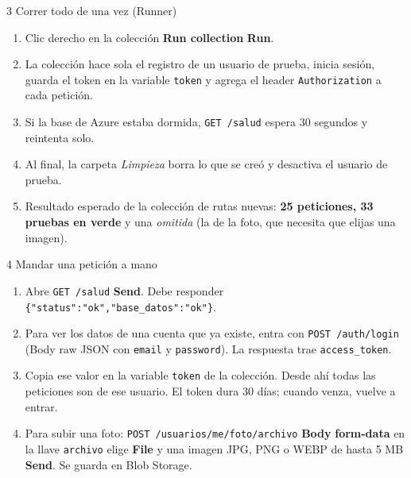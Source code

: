 \documentclass[11pt,a4paper]{article}
\newcommand{\menu}[1]{\textsf{\textbf{#1}}}
\begin{document}
\begin{paso}{3 \textperiodcentered{} Correr todo de una vez (Runner)}
\begin{enumerate}[leftmargin=*]
  \item Clic derecho en la colección \textrightarrow{} \menu{Run collection} \textrightarrow{} \menu{Run}.
  \item La colección hace sola el registro de un usuario de prueba, inicia sesión, guarda el token en la
        variable \texttt{token} y agrega el header \texttt{Authorization} a cada petición.
  \item Si la base de Azure estaba dormida, \texttt{GET /salud} espera 30 segundos y reintenta solo.
  \item Al final, la carpeta \emph{Limpieza} borra lo que se creó y desactiva el usuario de prueba.
  \item Resultado esperado de la colección de rutas nuevas: \textbf{25 peticiones, 33 pruebas en verde} y una
        \emph{omitida} (la de la foto, que necesita que elijas una imagen).
\end{enumerate}
\end{paso}

\begin{paso}{4 \textperiodcentered{} Mandar una petición a mano}
\begin{enumerate}[leftmargin=*]
  \item Abre \texttt{GET /salud} \textrightarrow{} \menu{Send}. Debe responder \texttt{\{"status":"ok","base\_datos":"ok"\}}.
  \item Para ver los datos de una cuenta que ya existe, entra con \texttt{POST /auth/login}
        (Body \textrightarrow{} raw \textrightarrow{} JSON con \texttt{email} y \texttt{password}). La respuesta trae \texttt{access\_token}.
  \item Copia ese valor en la variable \texttt{token} de la colección. Desde ahí todas las
        peticiones son de ese usuario. El token dura 30 días; cuando venza, vuelve a entrar.
  \item Para subir una foto: \texttt{POST /usuarios/me/foto/archivo} \textrightarrow{} \menu{Body}
        \textrightarrow{} \menu{form-data} \textrightarrow{} en la llave \texttt{archivo} elige \menu{File} y una imagen
        JPG, PNG o WEBP de hasta 5 MB \textrightarrow{} \menu{Send}. Se guarda en Blob Storage.
\end{enumerate}
\end{paso}
\end{document}
